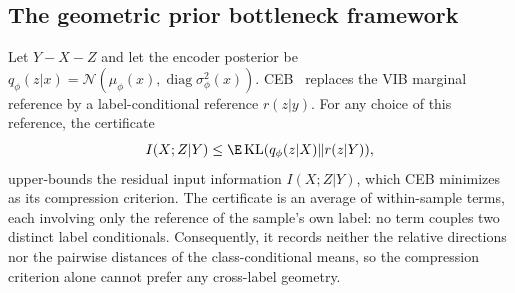\subsection{The geometric prior bottleneck framework}

Let $Y-X-Z$ and let the encoder posterior be
$q_\phi(z|x)=\mathcal N(\mu_\phi(x),\operatorname{diag}\sigma_\phi^2(x))$.
CEB~\citep{fischer2020conditional} replaces the VIB marginal reference by a
label-conditional reference $r(z|y)$. For any choice of this reference, the
certificate
\begin{equation}
I(X;Z|Y)\le\E\KL(q_\phi(z|X)\|r(z|Y)),
\label{eq:gap}
\end{equation}
upper-bounds the residual input information $I(X;Z|Y)$, which CEB minimizes as its
compression criterion. The certificate is an average of within-sample terms, each
involving only the reference of the sample's own label: no term couples two
distinct label conditionals. Consequently, it records neither the relative
directions nor the pairwise distances of the class-conditional means, so the
compression criterion alone cannot prefer any cross-label geometry.

